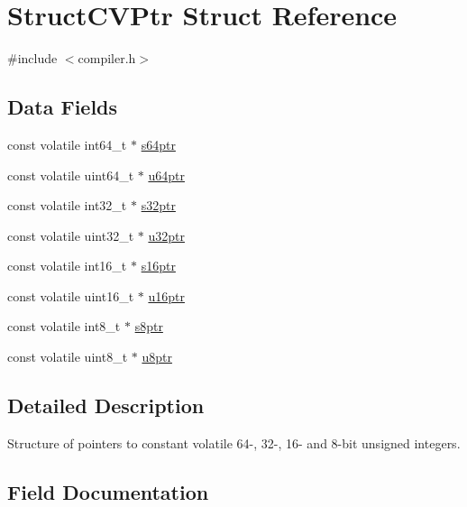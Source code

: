 \hypertarget{struct_struct_c_v_ptr}{}\section{Struct\+C\+V\+Ptr Struct Reference}
\label{struct_struct_c_v_ptr}


{\ttfamily \#include $<$compiler.\+h$>$}

\subsection*{Data Fields}
\begin{DoxyCompactItemize}
\item 
const volatile int64\+\_\+t $\ast$ \mbox{\hyperlink{struct_struct_c_v_ptr_aa79f3b96a6ad079e73cc0be13bd0e765}{s64ptr}}
\item 
const volatile uint64\+\_\+t $\ast$ \mbox{\hyperlink{struct_struct_c_v_ptr_a24a2bedaf12d427819c62babba34e2ef}{u64ptr}}
\item 
const volatile int32\+\_\+t $\ast$ \mbox{\hyperlink{struct_struct_c_v_ptr_a0aa7d6575057bad6b799c9b2909c077b}{s32ptr}}
\item 
const volatile uint32\+\_\+t $\ast$ \mbox{\hyperlink{struct_struct_c_v_ptr_a0e4e80d3c57067ad85c71af39d0ea817}{u32ptr}}
\item 
const volatile int16\+\_\+t $\ast$ \mbox{\hyperlink{struct_struct_c_v_ptr_a97b5d4643b545ecc9ac9c68fa35b74fe}{s16ptr}}
\item 
const volatile uint16\+\_\+t $\ast$ \mbox{\hyperlink{struct_struct_c_v_ptr_a288ff13c7abb2360d62009e2711e7485}{u16ptr}}
\item 
const volatile int8\+\_\+t $\ast$ \mbox{\hyperlink{struct_struct_c_v_ptr_afc839213e22402ccf98e7d143453b58d}{s8ptr}}
\item 
const volatile uint8\+\_\+t $\ast$ \mbox{\hyperlink{struct_struct_c_v_ptr_ae6228fb5d646745079910ea045f314e3}{u8ptr}}
\end{DoxyCompactItemize}


\subsection{Detailed Description}
Structure of pointers to constant volatile 64-\/, 32-\/, 16-\/ and 8-\/bit unsigned integers. 

\subsection{Field Documentation}
\mbox{\label{struct_struct_c_v_ptr_a97b5d4643b545ecc9ac9c68fa35b74fe}} 
